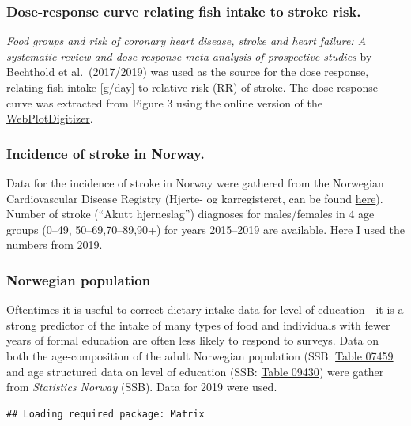 \documentclass[
]{article}
\begin{document}
\hypertarget{dose-response-curve-relating-fish-intake-to-stroke-risk.}{%
\subsubsection{Dose-response curve relating fish intake to stroke
risk.}\label{dose-response-curve-relating-fish-intake-to-stroke-risk.}}

\emph{Food groups and risk of coronary heart disease, stroke and heart
failure: A systematic review and dose-response meta-analysis of
prospective studies} by Bechthold et al.~(2017/2019) was used as the
source for the dose response, relating fish intake {[}g/day{]} to
relative risk (RR) of stroke. The dose-response curve was extracted from
Figure 3 using the online version of the
\href{https://automeris.io/WebPlotDigitizer/}{WebPlotDigitizer}.

\hypertarget{incidence-of-stroke-in-norway.}{%
\subsubsection{Incidence of stroke in
Norway.}\label{incidence-of-stroke-in-norway.}}

Data for the incidence of stroke in Norway were gathered from the
Norwegian Cardiovascular Disease Registry (Hjerte- og karregisteret, can
be found \href{http://statistikkbank.fhi.no/hkr/}{here}). Number of
stroke (``Akutt hjerneslag'') diagnoses for males/females in 4 age
groups (0--49, 50--69,70--89,90+) for years 2015--2019 are available.
Here I used the numbers from 2019.

\hypertarget{norwegian-population}{%
\subsubsection{Norwegian population}\label{norwegian-population}}

Oftentimes it is useful to correct dietary intake data for level of
education - it is a strong predictor of the intake of many types of food
and individuals with fewer years of formal education are often less
likely to respond to surveys. Data on both the age-composition of the
adult Norwegian population (SSB:
\href{https://www.ssb.no/statbank/table/07459/}{Table 07459} and age
structured data on level of education (SSB:
\href{https://www.ssb.no/statbank/table/09430/}{Table 09430}) were
gather from \emph{Statistics Norway} (SSB). Data for 2019 were used.

\begin{verbatim}
## Loading required package: Matrix
\end{verbatim}
\end{document}

